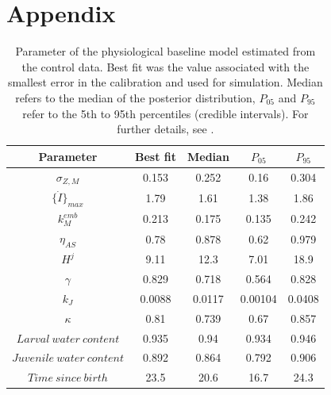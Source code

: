 \documentclass[preprint,12pt]{elsarticle}
\begin{document}
\clearpage
\appendix
\section{Appendix}

\renewcommand{\thetable}{A\arabic{table}}
\setcounter{table}{0}

\begin{table}[h]
    \caption{Parameter of the physiological baseline model estimated from the control data. 
    Best fit was the value associated with the smallest error in the calibration and used for simulation.
    Median refers to the median of the posterior distribution, $P_{05}$ and $P_{95}$ refer to the 5th to 95th percentiles 
    (credible intervals).
    For further details, see \citet{hansulDynamicEnergyBudget2026}.}
    \label{tab:deb_params}
    \begin{tabular}{ccccc}
    Parameter & Best fit & Median & $P_{05}$ & $P_{95}$\\
    \hline
    $\sigma_{Z,M}$ & 0.153 & 0.252 & 0.16 & 0.304\\
    $\{ \dot{I} \}_{max}$ & 1.79 & 1.61 & 1.38 & 1.86\\
    $k_M^{emb}$ & 0.213 & 0.175 & 0.135 & 0.242\\
    $\eta_{AS}$ & 0.78 & 0.878 & 0.62 & 0.979\\
    $H^{j}$ & 9.11 & 12.3 & 7.01 & 18.9\\
    $\gamma$ & 0.829 & 0.718 & 0.564 & 0.828\\
    $k_J$ & 0.0088 & 0.0117 & 0.00104 & 0.0408\\
    $\kappa$ & 0.81 & 0.739 & 0.67 & 0.857\\
    $Larval\ water\ content$ & 0.935 & 0.94 & 0.934 & 0.946\\
    $Juvenile\ water\ content$ & 0.892 & 0.864 & 0.792 & 0.906\\
    $Time\ since\ birth$ & 23.5 & 20.6 & 16.7 & 24.3\\
    \end{tabular}
\end{table}









\end{document}

